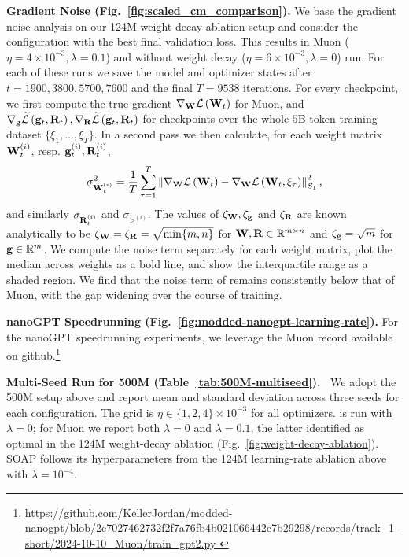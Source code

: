 \textbf{Gradient Noise (Fig.\ \ref{fig:scaled_cm_comparison}).} We base the gradient noise analysis on our 124M weight decay ablation setup and consider the configuration with the best final validation loss. This results in Muon ($\eta = 4 \times 10^{-3}, \lambda = 0.1$) and \algname{} without weight decay ($\eta = 6 \times 10^{-3}, \lambda = 0$) run. For each of these runs we save the model and optimizer states after $t = 1900, 3800, 5700, 7600$ and the final $T = 9538$ iterations. For every checkpoint, we first compute the true gradient $\nabla_{\mathbf{W}} \mathcal L \left( \mathbf{W}_t \right)$ for Muon, and $\nabla_{\mathbf{g}} \widetilde {\mathcal{L}}\left( \mathbf{g}_t, \mathbf{R}_t \right), \nabla_{\mathbf{R}} \widetilde {\mathcal{L}} \left( \mathbf{g}_t, \mathbf{R}_t \right)$ for \algname{} checkpoints over the whole $5$B token training dataset $\{\xi_1, \dots, \xi_T\}$. In a second pass we then calculate, for each weight matrix $\mathbf{W}_t^{(i)}$, resp. $\mathbf{g}_t^{(i)}, \mathbf{R}_t^{(i)}$,
\begin{equation*}
    \sigma_{\mathbf{W}_t^{(i)}}^2 = \frac 1 T \sum_{\tau = 1}^{T}
    \left \| \nabla_{\mathbf{W}} \mathcal L \left( \mathbf{W}_t \right) - \nabla_{\mathbf{W}} \mathcal L \left( \mathbf{W}_t, \xi_\tau \right) \right\|_{S_1}^2,
\end{equation*}
and similarly $\sigma_{\mathbf{R}_t^{(i)}}$ and $\sigma_{\gt^{(i)}}$. The values of $\zeta_{\mathbf{W}}, \zeta_{\mathbf{g}}$ and $\zeta_{\mathbf{R}}$ are known analytically to be $\zeta_{\mathbf{W}} = \zeta_{\mathbf{R}} = \sqrt{\min\{m, n\}}$ for $\mathbf{W}, \mathbf{R} \in \mathbb R^{m \times n}$ and $\zeta_{\mathbf{g}} = \sqrt{m}$ for $\mathbf{g} \in \mathbb R^m$. We compute the noise term separately for each weight matrix, plot the median across weights as a bold line, and show the interquartile range as a shaded region. We find that the noise term of \algname{} remains consistently below that of Muon, with the gap widening over the course of training.

\textbf{nanoGPT Speedrunning (Fig.~\ref{fig:modded-nanogpt-learning-rate}). } For the nanoGPT speedrunning \citep{modded_nanogpt_2024} experiments, we leverage the Muon record available on github.\footnote{\url{https://github.com/KellerJordan/modded-nanogpt/blob/2c7027462732f2f7a76fb4b021066442c7b29298/records/track_1_short/2024-10-10_Muon/train_gpt2.py
}} 

\textbf{Multi-Seed Run for 500M (Table~\ref{tab:500M-multiseed}).\ } We adopt the 500M setup above and report mean and standard deviation across three seeds for each configuration. The grid is $\eta \in \{1, 2, 4\}\times 10^{-3}$ for all optimizers. \algname{} is run with $\lambda=0$; for Muon we report both $\lambda=0$ and $\lambda=0.1$, the latter identified as optimal in the 124M weight-decay ablation (Fig.~\ref{fig:weight-decay-ablation}). SOAP follows its hyperparameters from the 124M learning-rate ablation above with $\lambda=10^{-4}$.


